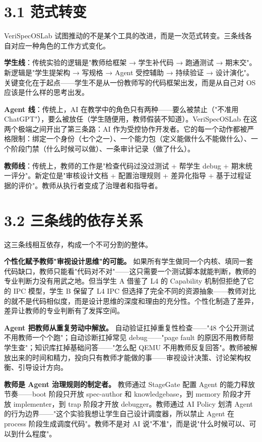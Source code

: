 \documentclass[UTF8,a4paper,12pt,openany]{ctexrep}
\begin{document}
\section{3.1 范式转变}\label{31-ux8303ux5f0fux8f6cux53d8}

VeriSpecOSLab 试图推动的不是某个工具的改进，而是一次范式转变。三条线各自对应一种角色的工作方式变化。

\textbf{学生线}：传统实验的逻辑是"教师给框架 → 学生补代码 → 跑通测试 → 期末交"。新逻辑是"学生提架构 → 写规格 → Agent 受控辅助 → 持续验证 → 设计演化"。关键变化在于起点------学生不是从一份教师写的代码框架出发，而是从自己对 OS 应该是什么样的思考出发。

\textbf{Agent 线}：传统上，AI 在教学中的角色只有两种------要么被禁止（"不准用 ChatGPT"），要么被放任（学生随便用，教师假装不知道）。VeriSpecOSLab 在这两个极端之间开出了第三条路：AI 作为受控协作开发者。它的每一个动作都被严格限制：绑定一个身份（七个之一）、一个能力包（定义能做什么不能做什么）、一个阶段门禁（什么时候可以做）、一条审计记录（做了什么）。

\textbf{教师线}：传统上，教师的工作是"检查代码过没过测试 + 帮学生 debug + 期末统一评分"。新定位是"审核设计文档 + 配置治理规则 + 差异化指导 + 基于过程证据的评价"。教师从执行者变成了治理者和指导者。

\section{3.2 三条线的依存关系}\label{32-ux4e09ux6761ux7ebfux7684ux4f9dux5b58ux5173ux7cfb}

这三条线相互依存，构成一个不可分割的整体。

\textbf{个性化赋予教师"审视设计思维"的可能。} 如果所有学生做同一个内核、填同一套代码缺口，教师只能看"代码对不对"------这只需要一个测试脚本就能判断，教师的专业判断力没有用武之地。但当学生 A 借鉴了 L4 的 Capability 机制但拒绝了它的 IPC 模型，学生 B 保留了 L4 IPC 但选择了完全不同的资源抽象------教师对比的就不是代码相似度，而是设计思维的深度和理由的充分性。个性化制造了差异，差异让教师的专业判断有了发挥空间。

\textbf{Agent 把教师从重复劳动中解放。} 自动验证扛掉重复性检查------"48 个公开测试不用教师一个个跑"；自动诊断扛掉常见 debug------"page fault 的原因不用教师帮学生查"；知识库扛掉基础问答------"怎么配 QEMU 不用教师反复回答"。教师被解放出来的时间和精力，投向只有教师才能做的事------审视设计决策、讨论架构权衡、引导设计方向。

\textbf{教师是 Agent 治理规则的制定者。} 教师通过 StageGate 配置 Agent 的能力释放节奏------boot 阶段只开放 spec-author 和 knowledgebase，到 memory 阶段才开放 implementer，到 trap 阶段才开放 debugger。教师通过 AI Policy 划清 Agent 的行为边界------"这个实验我想让学生自己设计调度器，所以禁止 Agent 在 process 阶段生成调度代码"。教师不是对 AI 说"不准"，而是说"什么时候可以、可以到什么程度"。
\end{document}
